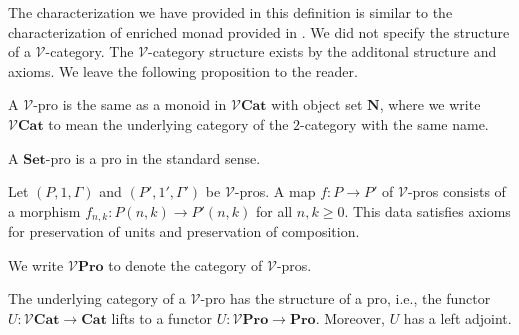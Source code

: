 \documentclass{tac}
\begin{document}
The characterization we have provided in this definition is similar to the characterization of enriched monad provided in \cite{McDermottUustalu2022}. We did not specify the structure of a $\mathcal{V}$-category. The $\mathcal{V}$-category structure exists by the additonal structure and axioms. We leave the following proposition to the reader. 

\begin{proposition}
A $\mathcal{V}$-pro is the same as a monoid in $\mathcal{V}\mathbf{Cat}$ with object set $\mathbf{N}$, where we write $\mathcal{V}\mathbf{Cat}$ to mean the underlying category of the $2$-category with the same name.
\end{proposition}


\begin{example}
A $\mathbf{Set}$-pro is a pro in the standard sense.  
\end{example}


\begin{definition}
Let $(P,1,\Gamma)$ and $(P',1',\Gamma')$ be $\mathcal{V}$-pros. A map $f:P\to P'$ of $\mathcal{V}$-pros consists of a morphism $f_{n,k}:P(n,k)\to P'(n,k)$ for all $n,k\geq 0$. This data satisfies axioms for preservation of units and preservation of composition.
\end{definition}

We write $\mathcal{V}\mathbf{Pro}$ to denote the category of $\mathcal{V}$-pros.

\begin{proposition}
The underlying category of a $\mathcal{V}$-pro has the structure of a pro, i.e., the functor $U:\mathcal{V}\mathbf{Cat}\to\mathbf{Cat}$ lifts to a functor
$U:\mathcal{V}\mathbf{Pro}\to \mathbf{Pro}$. Moreover, $U$ has a left adjoint.
\end{proposition}
\end{document}
